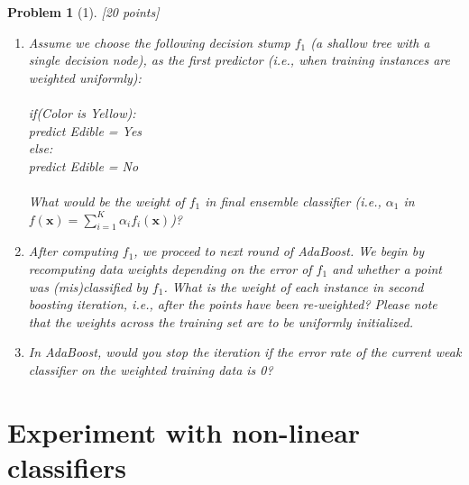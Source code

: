 \documentclass[11pt]{article}
\theoremstyle{quest}
\newtheorem*{problem}{Problem}
\begin{document}
\begin{problem}[1] [20 points]
\begin{enumerate}
\item Assume we choose the following decision stump $f_1$ (a shallow tree with a single decision node), as the first predictor (i.e., when training instances are weighted uniformly):\\\\
    \textsf{
    if(Color is Yellow):\\
        \hspace*{5mm}  predict Edible = Yes\\
    else:\\
        \hspace*{5mm}  predict Edible = No\\\\
    }
    What would be the weight of $f_1$ in final ensemble classifier (i.e., $\alpha_1$ in $f(\bm{x}) = \sum_{i=1}^{K} \alpha_{i}f_{i}(\bm{x})$)?
    \item After computing $f_1$, we proceed to next round of AdaBoost. We begin by recomputing data weights depending on the error of $f_1$ and whether a point was (mis)classified by $f_1$. What is the weight of each instance in second boosting iteration, i.e., after the points have been re-weighted? Please note that the weights across the training set are to be uniformly initialized.
    \item In AdaBoost, would you stop the iteration if the error rate of the current weak classifier on the weighted training data is 0?
\end{enumerate}
\end{problem}

\section*{Experiment with non-linear classifiers}
\end{document}
